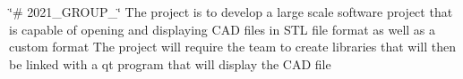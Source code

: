 \char`\"{}\# 2021\+\_\+\+GROUP\+\_\char`\"{} The project is to develop a large scale software project that is capable of opening and displaying CAD files in STL file format as well as a custom format The project will require the team to create libraries that will then be linked with a qt program that will display the CAD file 